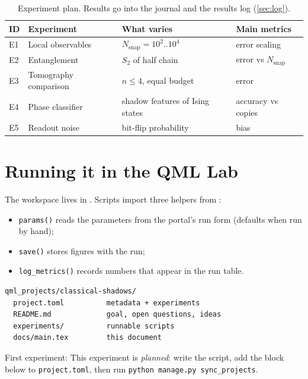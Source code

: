 \documentclass[11pt,a4paper]{article}
\begin{document}
\begin{table}[h]
\centering\small
\begin{tabularx}{\linewidth}{@{}l>{\raggedright}X>{\raggedright}X>{\raggedright\arraybackslash}X@{}}
\toprule
ID & Experiment & What varies & Main metrics \\
\midrule
  E1 & Local observables & $N_{\text{snap}}=10^2..10^4$ & error scaling \\
  E2 & Entanglement & $S_2$ of half chain & error vs $N_{\text{snap}}$ \\
  E3 & Tomography comparison & $n\le4$, equal budget & error \\
  E4 & Phase classifier & shadow features of Ising states & accuracy vs copies \\
  E5 & Readout noise & bit-flip probability & bias \\
\bottomrule
\end{tabularx}
\caption{Experiment plan. Results go into the journal and the results log (\cref{sec:log}).}
\end{table}

\section{Running it in the QML Lab}
The workspace lives in . Scripts import three helpers from
:
\begin{itemize}
  \item \texttt{params()} reads the parameters from the portal's run form (defaults when run by hand);
  \item \texttt{save()} stores figures with the run;
  \item \texttt{log\_metrics()} records numbers that appear in the run table.
\end{itemize}

\begin{lstlisting}
qml_projects/classical-shadows/
  project.toml          metadata + experiments
  README.md             goal, open questions, ideas
  experiments/          runnable scripts
  docs/main.tex         this document
\end{lstlisting}

First experiment: This experiment is \emph{planned}: write the script, add the block below to \texttt{project.toml}, then run \texttt{python manage.py sync\_projects}.
\end{document}
